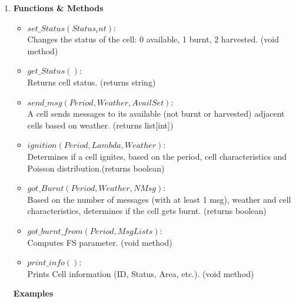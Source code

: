 \documentclass[11pt]{article}
\begin{document}
\begin{enumerate}
\begin{enumerate}
 		\item \textbf{Functions \& Methods}
 			\begin{itemize}
 				\item $set\_Status(Status_int)$:\\ Changes the status of the cell: 0 available, 1 burnt, 2 harvested. \hfill (void method)
 				\item $get\_Status()$:\\ Returns cell status. \hfill (returns string)
 				\item $send\_msg(Period,Weather,AvailSet)$:\\ A cell sends messages to its available (not burnt or harvested) adjacent cells based on weather. \hfill (returns list[int])
 				\item $ignition(Period,Lambda,Weather)$:\\ Determines if a cell ignites, based on the period, cell characteristics and Poisson distribution.\hfill (returns boolean)		
 				\item $got\_Burnt(Period,Weather,NMsg)$:\\ Based on the number of messages (with at least 1 msg), weather and cell characteristics, determines if the cell gets burnt. \hfill (returns boolean)
				\item $got\_burnt\_from(Period,MsgLists)$:\\ Computes FS parameter. \hfill (void method)
 				\item $print\_info()$:\\ Prints Cell information (ID, Status, Area, etc.). \hfill (void method)\\ 
 			\end{itemize} 
 			\textbf{Examples}			
\begin{itemize}


\end{itemize}
\end{enumerate}
\end{enumerate}
\end{document}
